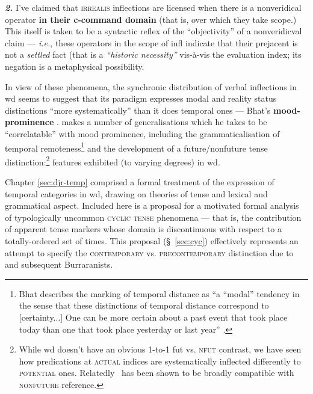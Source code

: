  \textbf{\textit{2.}} I've claimed that \textsc{irrealis} inflections are licensed when there is a nonveridical operator \textbf{in their c-command domain} (that is, over which they take scope.) \\This itself is taken to be a syntactic reflex of the ``objectivity'' of a nonveridicval claim --- \textit{i.e.}, these operators in the scope of \gls{infl} indicate that their prejacent is not a \textit{settled} fact (that is a \textit{``historic necessity''} vis-à-vis the evaluation index; its negation is a metaphysical possibility.



In view of these phenomena, the synchronic distribution of verbal inflections in \gls{wd} seems to suggest that its paradigm expresses modal and reality status distinctions ``more systematically'' than it does temporal ones --- Bhat's \textbf{mood-prominence} \citeyearpar[136]{Bhat1999}. \citet[183]{Bhat1999} makes a number of generalisations which he takes to be ``correlatable'' with mood prominence, including the grammaticalisation of temporal remoteness\footnote{Bhat describes the marking of temporal distance  as ``a ``modal'' tendency in the sense that these distinctions of temporal distance correspond to [certainty...] One can be more certain about a past event that took place today than one that took place yesterday or last year'' \citeyearpar[183]{Bhat1999}.} and the development of a future/nonfuture tense distinction:\footnote{While \gls{wd} doesn't have an obvious 1-to-1 \gls{fut} vs. \textsc{nfut} contrast, we have seen how predications at \textsc{actual} indices are systematically inflected differently to \textsc{potential} ones. Relatedly \I~has been shown to be broadly compatible with \textsc{nonfuture} reference.} features exhibited (to varying degrees) in \gls{wd}.


Chapter \ref{sec:djr-temp} comprised a formal treatment of the expression of temporal categories in \gls{wd}, drawing on theories of tense and lexical and grammatical aspect. Included here is a proposal for a motivated formal analysis of typologically uncommon \textsc{cyclic tense} phenomena --- that is, the contribution of apparent tense markers whose domain is discontinuous with respect to a totally-ordered set of times. This proposal (\S~\ref{sec:cyc}) effectively represents an attempt to specify the \textsc{contemporary} vs. \textsc{precontemporary} distinction due to \citet{Glasgow1964} and subsequent Burraranists.




